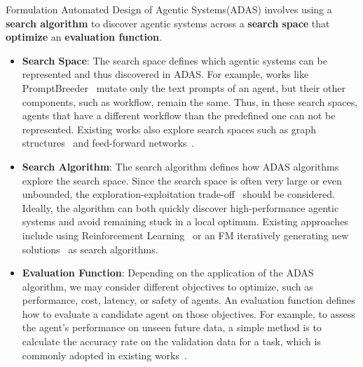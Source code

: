 \documentclass{article} %
\newcommand{\problemlong}{Automated Design of Agentic Systems\xspace}
\newcommand{\problem}{ADAS\xspace}
\begin{document}
\begin{mybox}{Formulation}
\problemlong (\problem) involves using a \textbf{search algorithm} to discover agentic systems across a \textbf{search space} that \textbf{optimize} an \textbf{evaluation function}.
\end{mybox}

\begin{itemize}[label=\large\textbullet, labelsep=0.5em, itemsep=0.2em, left=0pt]
    \item \textbf{Search Space}: The search space defines which agentic systems can be represented and thus discovered in \problem. For example, works like PromptBreeder~\citep{fernando2024promptbreeder} mutate only the text prompts of an agent, but their other components, such as workflow, remain the same. Thus, in these search spaces, agents that have a different workflow than the predefined one can not be represented. Existing works also explore search spaces such as graph structures~\citep{zhugegptswarm} and feed-forward networks~\citep{liu2023dynamic}.
    \item \textbf{Search Algorithm}: The search algorithm defines how \problem algorithms explore the search space. Since the search space is often very large or even unbounded, the exploration-exploitation trade-off~\citep{sutton2018reinforcement} should be considered. Ideally, the algorithm can both quickly discover high-performance agentic systems and avoid remaining stuck in a local optimum. Existing approaches include using Reinforcement Learning~\citep{zhugegptswarm} or an FM iteratively generating new solutions~\citep{fernando2024promptbreeder} as search algorithms.
    \item \textbf{Evaluation Function}: Depending on the application of the \problem algorithm, we may consider different objectives to optimize, such as performance, cost, latency, or safety of agents. An evaluation function defines how to evaluate a candidate agent on those objectives. For example, to assess the agent's performance on unseen future data, a simple method is to calculate the accuracy rate on the validation data for a task, which is commonly adopted in existing works~\citep{zhugegptswarm,fernando2024promptbreeder}.
\end{itemize}
\end{document}
